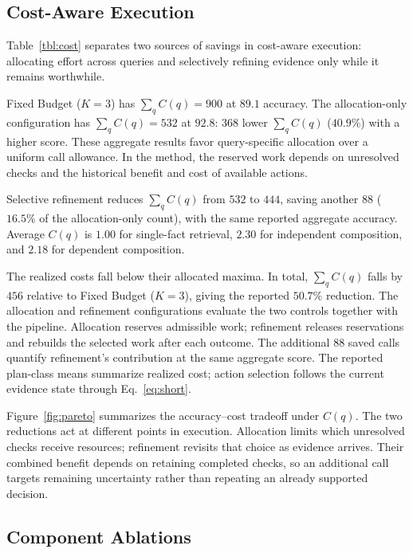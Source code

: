 \subsection{Cost-Aware Execution}
\label{subsec:exp4}

Table~\ref{tbl:cost} separates two sources of savings in cost-aware
execution: allocating effort across queries and selectively refining
evidence only while it remains worthwhile.

Fixed Budget ($K{=}3$) has $\sum_q C(q)=900$ at $89.1$ accuracy.
The allocation-only configuration has $\sum_q C(q)=532$ at $92.8$:
$368$ lower $\sum_q C(q)$ ($40.9\%$) with a higher score.
These aggregate results favor query-specific allocation over a uniform
call allowance. In the method, the reserved work depends on unresolved
checks and the historical benefit and cost of available actions.

Selective refinement reduces $\sum_q C(q)$ from $532$ to $444$, saving another $88$
($16.5\%$ of the allocation-only count), with the same reported aggregate
accuracy. Average $C(q)$ is $1.00$ for single-fact retrieval, $2.30$ for
independent composition, and $2.18$ for dependent composition.

The realized costs fall below their allocated maxima. In total,
$\sum_q C(q)$ falls by $456$ relative to Fixed Budget ($K{=}3$),
giving the reported $50.7\%$ reduction.
The allocation and refinement configurations evaluate the two controls
together with the pipeline. Allocation reserves admissible work;
refinement releases reservations and rebuilds the selected work after
each outcome. The additional $88$ saved calls quantify refinement's
contribution at the same aggregate score. The reported plan-class means
summarize realized cost; action selection follows the current evidence
state through Eq.~\eqref{eq:short}.

Figure~\ref{fig:pareto} summarizes the accuracy--cost tradeoff under $C(q)$.
The two reductions act at different points in execution. Allocation limits
which unresolved checks receive resources; refinement revisits that
choice as evidence arrives. Their combined benefit depends on retaining
completed checks, so an additional call targets remaining uncertainty
rather than repeating an already supported decision.



\subsection{Component Ablations}
\label{subsec:exp5}

